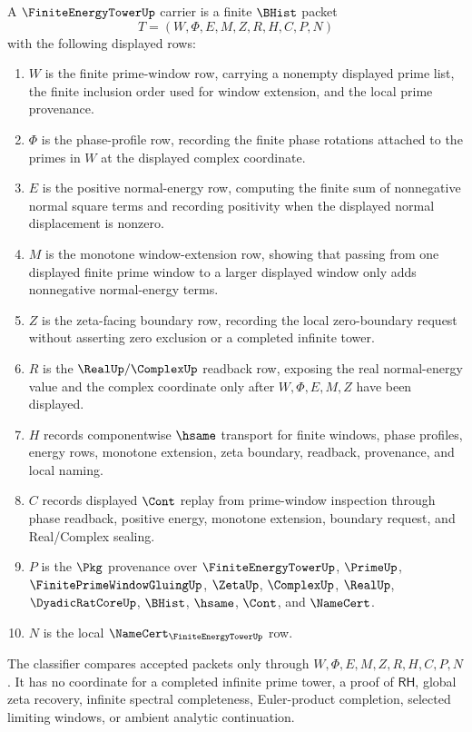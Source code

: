 \begin{definition}
\label{def:finite-energy-tower-carrier}
A $\FiniteEnergyTowerUp$ carrier is a finite $\BHist$ packet
$$
T=(W,\Phi,E,M,Z,R,H,C,P,N)
$$
with the following displayed rows:
\begin{enumerate}
\item $W$ is the finite prime-window row, carrying a nonempty displayed prime list, the finite inclusion order used for window extension, and the local prime provenance.
\item $\Phi$ is the phase-profile row, recording the finite phase rotations attached to the primes in $W$ at the displayed complex coordinate.
\item $E$ is the positive normal-energy row, computing the finite sum of nonnegative normal square terms and recording positivity when the displayed normal displacement is nonzero.
\item $M$ is the monotone window-extension row, showing that passing from one displayed finite prime window to a larger displayed window only adds nonnegative normal-energy terms.
\item $Z$ is the zeta-facing boundary row, recording the local zero-boundary request without asserting zero exclusion or a completed infinite tower.
\item $R$ is the $\RealUp/\ComplexUp$ readback row, exposing the real normal-energy value and the complex coordinate only after $W,\Phi,E,M,Z$ have been displayed.
\item $H$ records componentwise $\hsame$ transport for finite windows, phase profiles, energy rows, monotone extension, zeta boundary, readback, provenance, and local naming.
\item $C$ records displayed $\Cont$ replay from prime-window inspection through phase readback, positive energy, monotone extension, boundary request, and Real/Complex sealing.
\item $P$ is the $\Pkg$ provenance over $\FiniteEnergyTowerUp$, $\PrimeUp$, $\FinitePrimeWindowGluingUp$, $\ZetaUp$, $\ComplexUp$, $\RealUp$, $\DyadicRatCoreUp$, $\BHist$, $\hsame$, $\Cont$, and $\NameCert$.
\item $N$ is the local $\NameCert_{\FiniteEnergyTowerUp}$ row.
\end{enumerate}
The classifier compares accepted packets only through $W,\Phi,E,M,Z,R,H,C,P,N$. It has no coordinate for a completed infinite prime tower, a proof of $\mathsf{RH}$, global zeta recovery, infinite spectral completeness, Euler-product completion, selected limiting windows, or ambient analytic continuation.
\end{definition}

